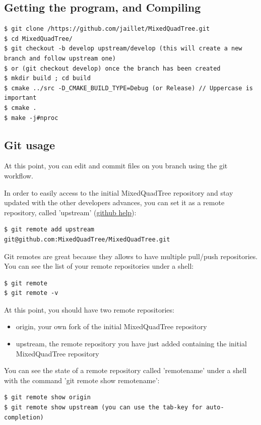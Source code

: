 \documentclass[10pt]{article}
\begin{document}
\subsection{Getting the program, and Compiling}

{\small
\begin{verbatim}
$ git clone /https://github.com/jaillet/MixedQuadTree.git
$ cd MixedQuadTree/
$ git checkout -b develop upstream/develop (this will create a new branch and follow upstream one)
$ or (git checkout develop) once the branch has been created
$ mkdir build ; cd build
$ cmake ../src -D_CMAKE_BUILD_TYPE=Debug (or Release) // Uppercase is important
$ cmake .
$ make -j#nproc
\end{verbatim}
}

\subsection{Git usage}
At this point, you can edit and commit files on you branch using  the git workflow.

In order to easily access to the initial MixedQuadTree repository and stay updated with the other developers advances, you can set it as a remote repository, called 'upstream' (\href{https://help.github.com/articles/syncing-a-fork/}{github help}):

\begin{verbatim}
$ git remote add upstream git@github.com:MixedQuadTree/MixedQuadTree.git
\end{verbatim}

Git remotes are great because they allows to have multiple pull/push repositories. You can see the list of your remote repositories under a shell:

\begin{verbatim}
$ git remote
$ git remote -v
\end{verbatim}

At this point, you should have two remote repositories:
%
\begin{itemize}
\item origin, your own fork of the initial MixedQuadTree repository
\item upstream, the remote repository you have just added containing the initial MixedQuadTree repository
\end{itemize}

You can see the state of a remote repository called 'remotename' under a shell with the command 'git remote show remotename':
%
\begin{verbatim}
$ git remote show origin
$ git remote show upstream (you can use the tab-key for auto-completion)
\end{verbatim}
\end{document}
